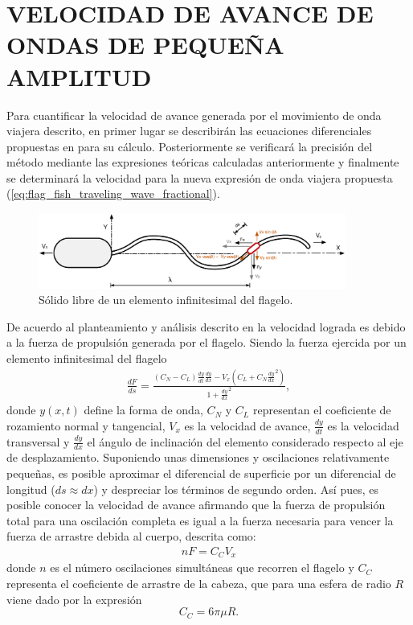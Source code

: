 \section{VELOCIDAD DE AVANCE DE ONDAS DE PEQUEÑA AMPLITUD} \label{sec:velocidad_pequena}
Para cuantificar la velocidad de avance generada por el movimiento de onda viajera descrito, en primer lugar se describirán las ecuaciones diferenciales propuestas en \cite{Gray1955} para su cálculo. Posteriormente se verificará la precisión del método mediante las expresiones teóricas calculadas anteriormente y finalmente se determinará la velocidad para la nueva expresión de onda viajera propuesta (\ref{eq:flag_fish_traveling_wave_fractional}).
\begin{figure}[!h] %
	\vspace*{3mm}
    \centering
    \includegraphics[width=0.9\textwidth]{Figuras/flagelo_dx}
  	\caption{Sólido libre de un elemento infinitesimal del flagelo.}
  	\label{fig:solido_flag}
\end{figure}

De acuerdo al planteamiento y análisis descrito en \cite{Gray1955} la velocidad lograda es debido a la fuerza de propulsión generada por el flagelo. Siendo la fuerza ejercida por un elemento infinitesimal del flagelo 
\begin{eqnarray}
	\label{eq:dF_ds}
	\frac{dF}{ds}= \frac{(C_N - C_L) \frac{dy}{dt}\frac{dy}{dx} - V_x \left(  C_L + C_N \frac{dy}{dx} ^2 \right)}{1 + \frac{dy}{dx}^2},
\end{eqnarray}
donde $y(x,t)$ define la forma de onda, $C_N$ y $C_L$ representan el coeficiente de rozamiento normal y tangencial, $V_x$ es la velocidad de avance, $\frac{dy}{dt}$ es la velocidad transversal y $\frac{dy}{dx}$ el ángulo de inclinación del elemento considerado respecto al eje de desplazamiento. Suponiendo unas dimensiones y oscilaciones relativamente pequeñas, es posible aproximar el diferencial de superficie por un diferencial de longitud ($ds \approx dx$) y despreciar los términos de segundo orden. Así pues, es posible conocer la velocidad de avance afirmando que la fuerza de propulsión total para una oscilación completa es igual a la fuerza necesaria para vencer la fuerza de arrastre debida al cuerpo, descrita como:
\begin{eqnarray}
	\label{eq:dF=}
	nF = C_C V_x
\end{eqnarray}
donde $n$ es el número oscilaciones simultáneas que recorren el flagelo y $C_C$ representa el coeficiente de arrastre de la cabeza, que para una esfera de radio $R$ viene dado por la expresión
\begin{equation}
C_C=6 \pi \mu R.
\end{equation}
\

